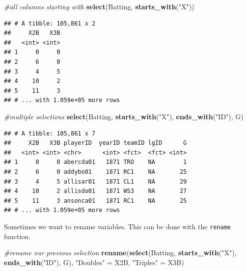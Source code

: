 \documentclass[
]{book}
\newenvironment{Shaded}{\begin{snugshade}}{\end{snugshade}}
\newcommand{\CommentTok}[1]{\textcolor[rgb]{0.56,0.35,0.01}{\textit{#1}}}
\newcommand{\KeywordTok}[1]{\textcolor[rgb]{0.13,0.29,0.53}{\textbf{#1}}}
\newcommand{\NormalTok}[1]{#1}
\newcommand{\StringTok}[1]{\textcolor[rgb]{0.31,0.60,0.02}{#1}}
\theoremstyle{definition}
\theoremstyle{definition}
\theoremstyle{definition}
\theoremstyle{remark}
\begin{document}
\begin{Shaded}
\begin{Highlighting}[]
\CommentTok{#all columns starting with}
\KeywordTok{select}\NormalTok{(Batting, }\KeywordTok{starts_with}\NormalTok{(}\StringTok{"X"}\NormalTok{))}
\end{Highlighting}
\end{Shaded}

\begin{verbatim}
## # A tibble: 105,861 x 2
##     X2B   X3B
##   <int> <int>
## 1     0     0
## 2     6     0
## 3     4     5
## 4    10     2
## 5    11     3
## # ... with 1.059e+05 more rows
\end{verbatim}

\begin{Shaded}
\begin{Highlighting}[]
\CommentTok{#multiple selections}
\KeywordTok{select}\NormalTok{(Batting, }\KeywordTok{starts_with}\NormalTok{(}\StringTok{"X"}\NormalTok{), }\KeywordTok{ends_with}\NormalTok{(}\StringTok{"ID"}\NormalTok{), G)}
\end{Highlighting}
\end{Shaded}

\begin{verbatim}
## # A tibble: 105,861 x 7
##     X2B   X3B playerID  yearID teamID lgID      G
##   <int> <int> <chr>      <int> <fct>  <fct> <int>
## 1     0     0 abercda01   1871 TRO    NA        1
## 2     6     0 addybo01    1871 RC1    NA       25
## 3     4     5 allisar01   1871 CL1    NA       29
## 4    10     2 allisdo01   1871 WS3    NA       27
## 5    11     3 ansonca01   1871 RC1    NA       25
## # ... with 1.059e+05 more rows
\end{verbatim}

Sometimes we want to rename variables. This can be done with the \texttt{rename} function.

\begin{Shaded}
\begin{Highlighting}[]
\CommentTok{#rename our previous selection}
\KeywordTok{rename}\NormalTok{(}\KeywordTok{select}\NormalTok{(Batting, }\KeywordTok{starts_with}\NormalTok{(}\StringTok{"X"}\NormalTok{), }\KeywordTok{ends_with}\NormalTok{(}\StringTok{"ID"}\NormalTok{), G), }\StringTok{"Doubles"}\NormalTok{ =}\StringTok{ }\NormalTok{X2B, }\StringTok{"Triples"}\NormalTok{ =}\StringTok{ }\NormalTok{X3B)}
\end{Highlighting}
\end{Shaded}
\end{document}
